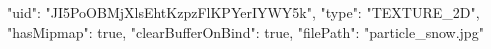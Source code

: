 {
    "uid": "JI5PoOBMjXlsEhtKzpzFlKPYerIYWY5k",
    "type": "TEXTURE_2D",
    "hasMipmap": true,
    "clearBufferOnBind": true,
    "filePath": "particle_snow.jpg"
}